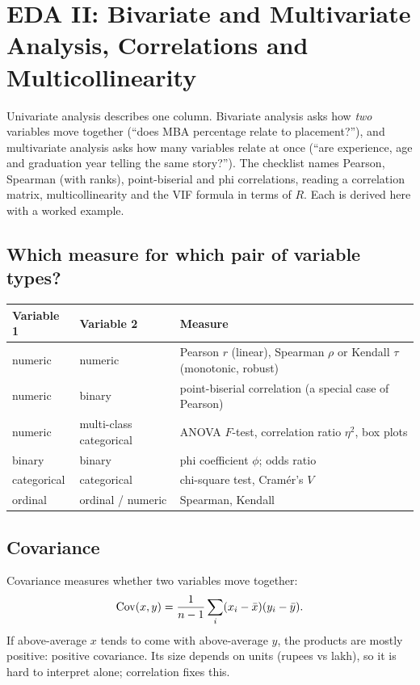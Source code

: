 \chapter{EDA II: Bivariate and Multivariate Analysis, Correlations and Multicollinearity}

Univariate analysis describes one column. Bivariate analysis asks how \emph{two} variables move together (``does MBA percentage relate to placement?''),
and multivariate analysis asks how many variables relate at once (``are experience, age and graduation year telling the same story?''). The checklist
names Pearson, Spearman (with ranks), point-biserial and phi correlations, reading a correlation matrix, multicollinearity and the VIF formula in terms of
$R$. Each is derived here with a worked example.

\section{Which measure for which pair of variable types?}
\begin{center}\small
\begin{tabularx}{\linewidth}{l l X}
\toprule
Variable 1 & Variable 2 & Measure\\
\midrule
numeric & numeric & Pearson $r$ (linear), Spearman $\rho$ or Kendall $\tau$ (monotonic, robust)\\
numeric & binary & point-biserial correlation (a special case of Pearson)\\
numeric & multi-class categorical & ANOVA $F$-test, correlation ratio $\eta^2$, box plots\\
binary & binary & phi coefficient $\phi$; odds ratio\\
categorical & categorical & chi-square test, Cram\'er's $V$\\
ordinal & ordinal / numeric & Spearman, Kendall\\
\bottomrule
\end{tabularx}
\end{center}

\section{Covariance}
Covariance measures whether two variables move together:
\[ \operatorname{Cov}(x,y) = \frac{1}{n-1}\sum_i(x_i - \bar x)(y_i - \bar y). \]
If above-average $x$ tends to come with above-average $y$, the products are mostly positive: positive covariance. Its size depends on units (rupees vs lakh),
so it is hard to interpret alone; correlation fixes this.

